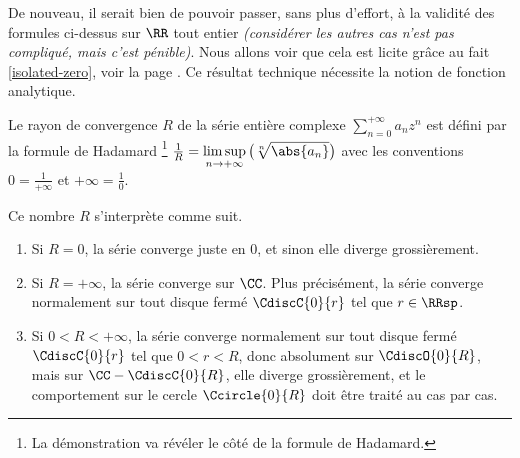 De nouveau, il serait bien de pouvoir passer, sans plus d'effort, à la validité des formules ci-dessus sur $\RR$ tout entier \emph{(considérer les autres cas n'est pas compliqué, mais c'est pénible)}.
%
Nous allons voir que cela est licite grâce au fait \ref{isolated-zero}, voir la page \pageref{isolated-zero}. Ce résultat technique nécessite la notion de fonction analytique.




\begin{preli} \label{conv-ray}
    Le rayon de convergence $R$ de la série entière complexe $\sum_{n=0}^{+\infty} a_n z^n$ est défini par la formule de Hadamard%
    \footnote{
    	La démonstration va révéler le côté  de la formule de Hadamard.
    }
    $\frac{1}{R} = \displaystyle\limsup_{n \to +\infty} \big( \sqrt[n]{\abs{a_n}} \big)$
    avec les conventions
    $0 = \frac{1}{+\infty}$
    et
    $+\infty = \frac{1}{0}$.
    
    \smallskip
    
    Ce nombre $R$ s'interprète comme suit.
    \begin{enumerate}
        \item Si $R = 0$, la série converge juste en $0$, et sinon elle diverge grossièrement.

        \item Si $R = +\infty$, la série converge sur $\CC$.
        Plus précisément, la série converge normalement sur tout disque fermé $\CdiscC{0}{r}$ tel que $r \in \RRsp$. 

        \item Si $0 < R < +\infty$, la série converge normalement sur tout disque fermé $\CdiscC{0}{r}$ tel que $0 < r < R$,
        donc absolument sur $\CdiscO{0}{R}$,
        mais sur $\CC - \CdiscC{0}{R}$, elle diverge grossièrement,
        et
        le comportement sur le cercle $\Ccircle{0}{R}$ doit être traité au cas par cas.
    \end{enumerate}
\end{preli}


